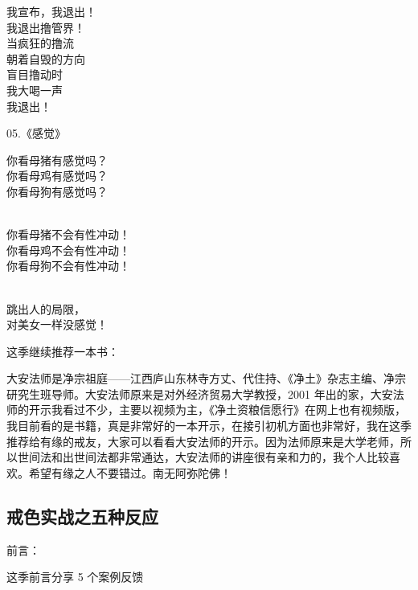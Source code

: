 \begin{multicols}{2}
\begin{center}
        我宣布，我退出！ \\ 我退出撸管界！ \\ 当疯狂的撸流 \\ 朝着自毁的方向 \\ 盲目撸动时 \\ 我大喝一声 \\ 我退出！
    \end{center}

    \begin{center}
        05.《感觉》\it

        你看母猪有感觉吗？ \\ 你看母鸡有感觉吗？ \\ 你看母狗有感觉吗？

        ~\\

        你看母猪不会有性冲动！ \\ 你看母鸡不会有性冲动！ \\ 你看母狗不会有性冲动！

        ~\\

        跳出人的局限， \\ 对美女一样没感觉！
    \end{center}
\end{multicols}

这季继续推荐一本书：

\begin{book}
    大安法师是净宗祖庭——江西庐山东林寺方丈、代住持、《净土》杂志主编、净宗研究生班导师。大安法师原来是对外经济贸易大学教授，2001 年出的家，大安法师的开示我看过不少，主要以视频为主，《净土资粮信愿行》在网上也有视频版，我目前看的是书籍，真是非常好的一本开示，在接引初机方面也非常好，我在这季推荐给有缘的戒友，大家可以看看大安法师的开示。因为法师原来是大学老师，所以世间法和出世间法都非常通达，大安法师的讲座很有亲和力的，我个人比较喜欢。希望有缘之人不要错过。南无阿弥陀佛！
\end{book}

\subsection{戒色实战之五种反应}

前言：

这季前言分享 5 个案例反馈

